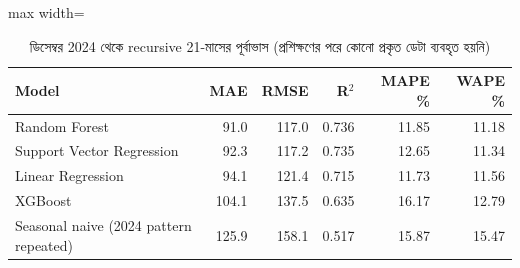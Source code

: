 \begin{table}[htbp]
\centering
\small
\caption{ডিসেম্বর 2024 থেকে recursive 21-মাসের পূর্বাভাস (প্রশিক্ষণের পরে কোনো প্রকৃত ডেটা ব্যবহৃত হয়নি)}
\label{tab:recursive}
\begin{adjustbox}{max width=\linewidth}
\begin{tabular}{lrrrrr}
\toprule
\textbf{Model} & \textbf{MAE} & \textbf{RMSE} & \textbf{R$^2$} & \textbf{MAPE \%} & \textbf{WAPE \%} \\
\midrule
Random Forest & 91.0 & 117.0 & 0.736 & 11.85 & 11.18 \\
Support Vector Regression & 92.3 & 117.2 & 0.735 & 12.65 & 11.34 \\
Linear Regression & 94.1 & 121.4 & 0.715 & 11.73 & 11.56 \\
XGBoost & 104.1 & 137.5 & 0.635 & 16.17 & 12.79 \\
Seasonal naive (2024 pattern repeated) & 125.9 & 158.1 & 0.517 & 15.87 & 15.47 \\
\bottomrule
\end{tabular}
\end{adjustbox}
\end{table}